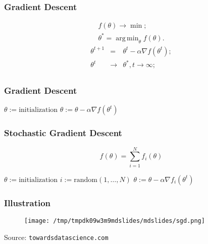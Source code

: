 \documentclass[mathserif, aspectratio=43]{beamer}
\DeclareMathOperator*{\argmin}{\mathrm{arg\,min}}
\begin{document}
\begin{frame}[fragile]
\frametitle{Gradient Descent}
\begin{eqnarray*}
f(\theta) \to \min;\\
\theta^* = \argmin_\theta f(\theta).
\end{eqnarray*}
\begin{eqnarray*}
  \theta^{t + 1} &=& \theta^t - \alpha \nabla f(\theta^t);\\
  \theta^t &\to& \theta^*, t \to \infty;\\
\end{eqnarray*}

\end{frame}


\begin{frame}[fragile]
\frametitle{Gradient Descent}
\begin{framed}
\begin{spacing}{1.75}
\begin{algorithmic}[1]
  \State $\theta := \text{initialization}$
    \State $\theta := \theta - \alpha \nabla f(\theta^t)$
  \EndFor
\end{algorithmic}
\end{spacing}
\end{framed}

\end{frame}


\begin{frame}[fragile]
\frametitle{Stochastic Gradient Descent}
$$f(\theta) = \sum^N_{i = 1} f_i(\theta)$$

\begin{framed}
\begin{spacing}{1.75}
\begin{algorithmic}[1]
  \State $\theta := \text{initialization}$
    \State $i := \mathrm{random}(1, \dots, N)$
    \State $\theta := \theta - \alpha \nabla f_i(\theta^t)$
  \EndFor
\end{algorithmic}
\end{spacing}
\end{framed}

\end{frame}


\begin{frame}[fragile]
\frametitle{Illustration}
\begin{figure}
\centering
\texttt{[image: /tmp/tmpdk09w3m9mdslides/mdslides/sgd.png]}

\end{figure}

{
  \footnotesize
  Source: \texttt{towardsdatascience.com}
}

\end{frame}
\end{document}
